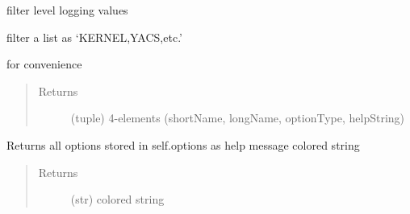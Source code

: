 \documentclass[a4paper,10pt,english]{sphinxmanual}
\begin{document}
\begin{fulllineitems}

\begin{fulllineitems}
\label{\detokenize{commands/apidoc/src:src.options.Options.debug_write}}
\end{fulllineitems}


\begin{fulllineitems}
\label{\detokenize{commands/apidoc/src:src.options.Options.filterLevel}}
filter level logging values

\end{fulllineitems}


\begin{fulllineitems}
\label{\detokenize{commands/apidoc/src:src.options.Options.filterList2}}
filter a list as ‘KERNEL,YACS,etc.’

\end{fulllineitems}


\begin{fulllineitems}
\label{\detokenize{commands/apidoc/src:src.options.Options.getDetailOption}}
for convenience
\begin{quote}\begin{description}
\item[{Returns}] \leavevmode
(tuple) 4-elements (shortName, longName, optionType, helpString)

\end{description}\end{quote}

\end{fulllineitems}


\begin{fulllineitems}
\label{\detokenize{commands/apidoc/src:src.options.Options.get_help}}
Returns all options stored in self.options 
as help message colored string
\begin{quote}\begin{description}
\item[{Returns}] \leavevmode
(str) colored string


\end{description}
\end{quote}
\end{fulllineitems}
\end{fulllineitems}
\end{document}

